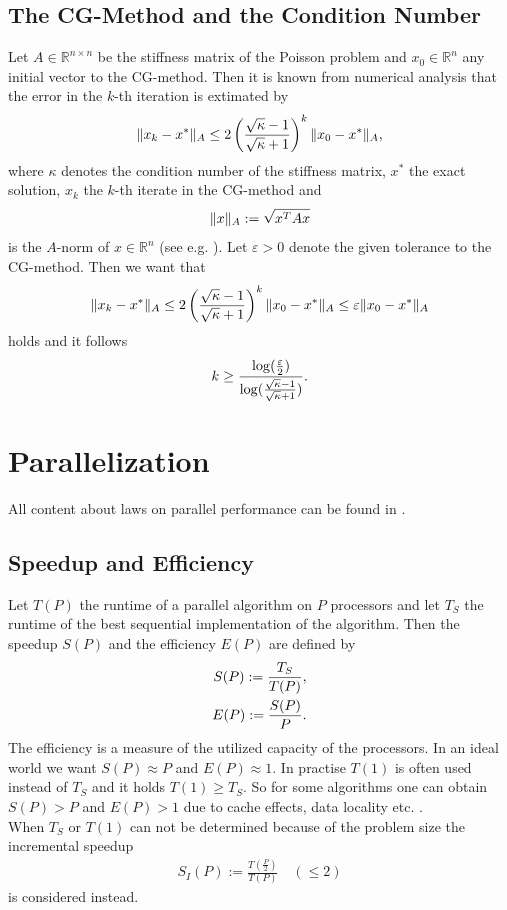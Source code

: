 \documentclass[a4paper, 11pt, twoside]{article}
\begin{document}
\subsection{The CG-Method and the Condition Number}
Let $A \in \mathbb{R}^{n \times n}$ be the stiffness matrix of the Poisson problem and $x_0 \in \mathbb{R}^n$ any initial vector to the CG-method. Then it is known from numerical analysis that the error in the $k$-th iteration is extimated by
\begin{equation}
\Vert x_k - x^*\Vert_A \leq 2 \left( \frac{\sqrt{\kappa} - 1}{\sqrt{\kappa} +1} \right) ^k \Vert x_0 - x^*\Vert_A, \notag
\end{equation}
where $\kappa$ denotes the condition number of the stiffness matrix, $x^*$ the exact solution, $x_k$ the $k$-th iterate in the CG-method and 
\begin{equation}
\Vert x\Vert_A := \sqrt{x^T A x} \notag
\end{equation}
is the $A$-norm of $x \in \mathbb{R}^n$ (see e.g. \cite[Chap IV Theorem 3.7]{braess}). Let $\varepsilon > 0$ denote the given tolerance to the CG-method. Then we want that
\begin{equation}
\Vert x_k - x^*\Vert_A \leq 2 \left( \frac{\sqrt{\kappa} - 1}{\sqrt{\kappa} +1} \right) ^k \Vert x_0 - x^*\Vert_A \leq \varepsilon \Vert x_0 - x^*\Vert_A \notag
\end{equation}
holds and it follows
\begin{equation}
k \geq \frac{\log ( \frac{\varepsilon}{2})}{\log ( \frac{\sqrt{\kappa} - 1}{\sqrt{\kappa} +1}) }. \notag
\end{equation}

\section{Parallelization}
All content about laws on parallel performance can be found in \cite{weiss}.
\subsection{Speedup and Efficiency}
Let $T(P)$ the runtime of a parallel algorithm on $P$ processors and let $T_S$ the runtime of the best sequential implementation of the algorithm. Then the speedup $S(P)$ and the efficiency $E(P)$ are defined by
\begin{align}
S(P) := \frac{T_S}{T(P)}, \label{speedup}\\
E(P) := \frac{S(P)}{P}. \notag
\end{align}
The efficiency is a measure of the utilized capacity of the processors. In an ideal world we want $S(P) \approx P$ and $E(P) \approx 1$. In practise $T(1)$ is often used instead of $T_S$ and it holds $T(1) \geq T_S$. So for some algorithms one can obtain $S(P) > P$ and $E(P) > 1$ due to cache effects, data locality etc. . \\
When $T_S$ or $T(1)$ can not be determined because of the problem size the incremental speedup 
\begin{align*}
S_I(P) := \frac{T(\frac{P}{2})}{T(P)} \quad ( \leq 2)
\end{align*} 
is considered instead.
\end{document}
